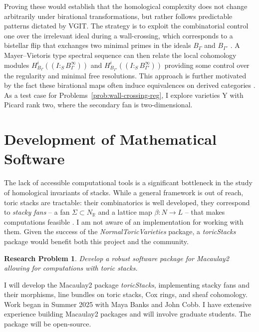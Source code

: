 \documentclass[11pt,reqno]{amsart}
\newtheorem{problem}[lemma]{Research Problem}
\theoremstyle{remark}
\newcommand{\RR}{\mathbb{R}}
\begin{document}
Proving these would establish that the homological complexity does not change arbitrarily under birational transformations, but rather follows predictable patterns dictated by VGIT. The strategy is to exploit the combinatorial control one over the irrelevant ideal during a wall-crossing, which corresponds to a bistellar flip that exchanges two minimal primes in the ideals $B_{\Gamma}$ and $B_{\Gamma'}$ \cite[Theorem 15.3.13]{CLS11}. A Mayer--Vietoris type spectral sequence can then relate the local cohomology modules $H^i_{B_{\Gamma}}((I :_{S} B_{\Gamma}^{\infty}))$ and $H^i_{B_{\Gamma'}}((I :_{S} B_{\Gamma'}^{\infty}))$ providing some control over the regularity and minimal free resolutions. This approach is further motivated by the fact these birational maps often induce equivalences on derived categories \cite{kawamata05,kawamata06,kawamata13,DHL15,kawamata16,ballardFaveroKatzarkov19}. As a test case for Problems~\ref{prob:wall-crossing-reg}, I explore varieties Y with Picard rank two, where the secondary fan is two-dimensional.

\section{Development of Mathematical Software}

The lack of accessible computational tools is a significant bottleneck in the study of homological invariants of stacks. While a general framework is out of reach,  toric stacks are tractable: their combinatorics is well developed,  they correspond to \emph{stacky fans} -- a fan $\Sigma \subset N_{\RR}$ and a lattice map $\beta:N\to L$ -- that makes computations feasible \cite{toricStacks1,toricStacks2,borisovChenSmith05}. I am not aware of an implementation for working with them. Given the success of the \textit{NormalToricVarieties} package, a \textit{toricStacks} package would benefit both this project and the community.


\begin{problem}\label{prob:toric-stacks-m2}
Develop a robust software package for \textit{Macaulay2} allowing for computations with toric stacks. 
\end{problem}

I will develop the Macaulay2 package \textit{toricStacks}, implementing stacky fans and their morphisms, line bundles on toric stacks, Cox rings, and sheaf cohomology. Work began in Summer 2025 with Maya Banks and John Cobb. I have extensive experience building Macaulay2 packages and will involve graduate students. The package will be open-source.
\end{document}
